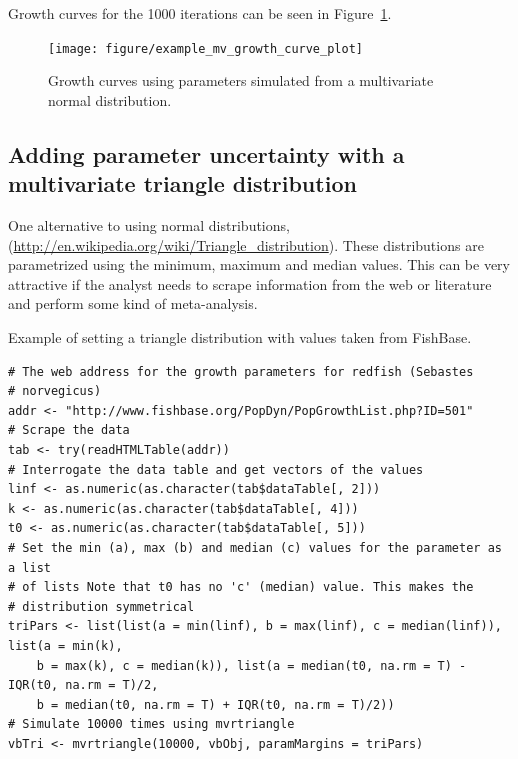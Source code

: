 \documentclass[a4paper,english,10pt]{article}\usepackage[]{graphicx}\usepackage[]{color}
\makeatletter
\newenvironment{kframe}{%
 \def\at@end@of@kframe{}%
 \ifinner\ifhmode%
  \def\at@end@of@kframe{\end{minipage}}%
  \begin{minipage}{\columnwidth}%
 \fi\fi%
 \def\FrameCommand##1{\hskip\@totalleftmargin \hskip-\fboxsep
 \colorbox{shadecolor}{##1}\hskip-\fboxsep
     \hskip-\linewidth \hskip-\@totalleftmargin \hskip\columnwidth}%
 \MakeFramed {\advance\hsize-\width
   \@totalleftmargin\z@ \linewidth\hsize
   \@setminipage}}%
 {\par\unskip\endMakeFramed%
 \at@end@of@kframe}
\newenvironment{knitrout}{}{} %
\makeatother
\begin{document}
Growth curves for the 1000 iterations can be seen in Figure~\ref{fig:plot_mv_growth}.

\begin{figure}[h]
\begin{knitrout}
\color{fgcolor}

{\centering \texttt{[image: figure/example\_mv\_growth\_curve\_plot]} 

}



\end{knitrout}

\caption{Growth curves using parameters simulated from a multivariate normal distribution.}
\label{fig:plot_mv_growth}
\end{figure}

\subsection{Adding parameter uncertainty with a multivariate triangle distribution}
\label{sec:growth_triangle_cop}

One alternative to using normal distributions, (\url{http://en.wikipedia.org/wiki/Triangle_distribution}). These distributions are parametrized using the minimum, maximum and median values. This can be very attractive if the analyst needs to scrape information from the web or literature and perform some kind of meta-analysis.

Example of setting a triangle distribution with values taken from FishBase.

\begin{knitrout}
\color{fgcolor}\begin{kframe}
\begin{verbatim}
# The web address for the growth parameters for redfish (Sebastes
# norvegicus)
addr <- "http://www.fishbase.org/PopDyn/PopGrowthList.php?ID=501"
# Scrape the data
tab <- try(readHTMLTable(addr))
# Interrogate the data table and get vectors of the values
linf <- as.numeric(as.character(tab$dataTable[, 2]))
k <- as.numeric(as.character(tab$dataTable[, 4]))
t0 <- as.numeric(as.character(tab$dataTable[, 5]))
# Set the min (a), max (b) and median (c) values for the parameter as a list
# of lists Note that t0 has no 'c' (median) value. This makes the
# distribution symmetrical
triPars <- list(list(a = min(linf), b = max(linf), c = median(linf)), list(a = min(k), 
    b = max(k), c = median(k)), list(a = median(t0, na.rm = T) - IQR(t0, na.rm = T)/2, 
    b = median(t0, na.rm = T) + IQR(t0, na.rm = T)/2))
# Simulate 10000 times using mvrtriangle
vbTri <- mvrtriangle(10000, vbObj, paramMargins = triPars)
\end{verbatim}
\end{kframe}
\end{knitrout}
\end{document}
